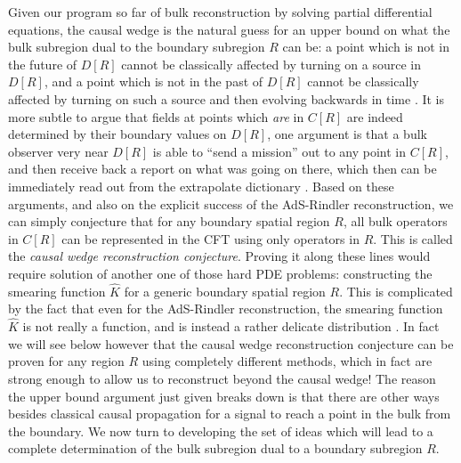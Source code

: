 \documentclass[toc]{PoS}
\begin{document}
Given our program so far of bulk reconstruction by solving partial differential equations, the causal wedge is the natural guess for an upper bound on what the bulk subregion dual to the boundary subregion $R$ can be: a point which is not in the future of $D[R]$ cannot be classically affected by turning on a source in $D[R]$, and a point which is not in the past of $D[R]$ cannot be classically affected by turning on such a source and then evolving backwards in time \cite{Bousso:2012sj}.  It is more subtle to argue that fields at points which \textit{are} in $C[R]$ are indeed determined by their boundary values on $D[R]$, one argument is that a bulk observer very near $D[R]$ is able to ``send a mission'' out to any point in $C[R]$, and then receive back a report on what was going on there, which then can be immediately read out from the extrapolate dictionary \cite{Bousso:2012sj}.  Based on these arguments, and also on the explicit success of the AdS-Rindler reconstruction, we can simply conjecture that for any boundary spatial region $R$, all bulk operators in $C[R]$ can be represented in the CFT using only operators in $R$.  This is called the \textit{causal wedge reconstruction conjecture}.  Proving it along these lines would require solution of another one of those hard PDE problems: constructing the smearing function $\hat{K}$ for a generic boundary spatial region $R$.  This is complicated by the fact that even for the AdS-Rindler reconstruction, the smearing function $\hat{K}$ is not really a function, and is instead a rather delicate distribution \cite{Hamilton:2006az,Papadodimas:2012aq,Morrison:2014jha,Almheiri:2014lwa}.  In fact we will see below however that the causal wedge reconstruction conjecture can be proven for any region $R$ using completely different methods, which in fact are strong enough to allow us to reconstruct beyond the causal wedge!  The reason the upper bound argument just given breaks down is that there are other ways besides classical causal propagation for a signal to reach a point in the bulk from the boundary.   We now turn to developing the set of ideas which will lead to a complete determination of the bulk subregion dual to a boundary subregion $R$.
\end{document}
